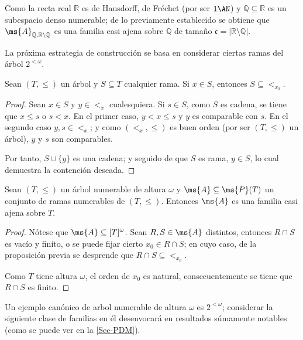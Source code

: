 	Como la recta real $\mathbb{R}$ es de Hausdorff, de Fréchet (por ser $1\AN$) y $\mathbb{Q} \subseteq \mathbb{R}$ es un subespacio denso numerable; de lo previamente establecido se obtiene que $\ms{A}_{\mathbb{Q},\mathbb{R}\setminus \mathbb{Q}}$ es una familia casi ajena sobre $\mathbb{Q}$ de tamaño $\mathfrak{c}=|\mathbb{R} \setminus \mathbb{Q}|$.
	
	La próxima estrategia de construcción se basa en considerar ciertas ramas del árbol $2^{<\omega}$.

	\begin{lema}
		Sean $(T,\leq)$ un árbol y $S \subseteq T$ cualquier rama. Si $x \in S$, entonces $S \subseteq <_{x_0}$.
	\end{lema}
	\begin{proof}
		Sean $x \in S$ y $y \in <_{x}$ cualesquiera. Si $s \in S$, como $S$ es cadena, se tiene que $x \leq s$ o $s < x$. En el primer caso, $y<x\leq s$ y $y$ es comparable con $s$. En el segundo caso $y,s \in <_{x}$; y como $(<_{x},\leq)$ es buen orden (por ser $(T,\leq)$ un árbol), $y$ y $s$ son comparables.

		Por tanto, $S \cup \{y\}$ es una cadena; y seguido de que $S$ es rama, $y \in S$, lo cual demuestra la contención deseada.
	\end{proof}

	\begin{proposicion}
		Sean $(T,\leq)$ un árbol numerable de altura $\omega$ y $\ms{A} \subseteq \ms{P}(T)$ un conjunto de ramas numerables de $(T,\leq)$. Entonces $\ms{A}$ es una familia casi ajena sobre $T$.
	\end{proposicion}
	
	\begin{proof}
		Nótese que $\ms{A} \subseteq [T]^\omega$. Sean $R,S \in \ms{A}$ distintos, entonces $R \cap S$ es vacío y finito, o se puede fijar cierto $x_0 \in R \cap S$; en cuyo caso, de la proposición previa se desprende que $R \cap S \subseteq <_{x_0}$.
		
		Como $T$ tiene altura $\omega$, el orden de $x_0$ es natural, consecuentemente se tiene que $R \cap S$ es finito. 
	\end{proof}

	Un ejemplo canónico de arbol numerable de altura $\omega$ es $2^{<\omega}$; considerar la siguiente clase de familias en él desenvocará en resultados súmamente notables (como se puede ver en la \autoref{Sec-PDM}).

